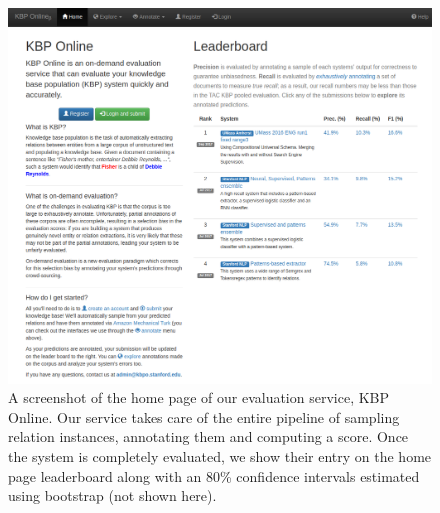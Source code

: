 \begin{figure}
  \centering
  \includegraphics[width=\textwidth]{figures/interface/leaderboard}
  \caption[KBP Online]{\label{fig:kbpo:kbpo}
  A screenshot of the home page of our evaluation service, KBP Online.
  Our service takes care of the entire pipeline of sampling relation instances, annotating them and computing a score.
Once the system is completely evaluated, we show their entry on the home page leaderboard along with an 80\% confidence intervals estimated using bootstrap (not shown here).
  }
\end{figure}

